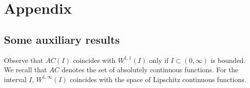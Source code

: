 \documentclass[11pt,a4paper]{article}
\theoremstyle{plain}
\theoremstyle{definition}
\theoremstyle{remark}
\newtheorem{remark}{Remark}
\begin{document}
		
		\section{Appendix}
		
		\label{Sec:Appendix}
		
		
		\subsection{Some auxiliary results}
		
		\label{sec:aux}
		
		Observe that $AC(I)$ coincides with $W^{1,1}(I)$ only if $I\subset (0,\infty)$ is bounded. We recall that $AC$ denotes the set of absolutely continuous functions. For the interval $I$, $W^{1,\infty}(I)$ coincides with the space of Lipschitz continuous functions.
		
		
		
		
\end{document}
